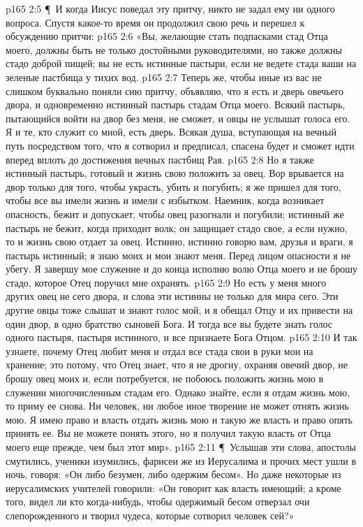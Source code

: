 \vs p165 2:5 \P\ И когда Иисус поведал эту притчу, никто не задал ему ни одного вопроса. Спустя какое\hyp{}то время он продолжил свою речь и перешел к обсуждению притчи:
\vs p165 2:6 «Вы, желающие стать подпасками стад Отца моего, должны быть не только достойными руководителями, но также должны  стадо доброй пищей; вы не есть истинные пастыри, если не ведете стада ваши на зеленые пастбища у тихих вод.
\vs p165 2:7 Теперь же, чтобы иные из вас не слишком буквально поняли сию притчу, объявляю, что я есть и дверь овечьего двора, и одновременно истинный пастырь стадам Отца моего. Всякий пастырь, пытающийся войти на двор без меня, не сможет, и овцы не услышат голоса его. Я и те, кто служит со мной, есть дверь. Всякая душа, вступающая на вечный путь посредством того, что я сотворил и предписал, спасена будет и сможет идти вперед вплоть до достижения вечных пастбищ Рая.
\vs p165 2:8 Но я также истинный пастырь, готовый и жизнь свою положить за овец. Вор врывается на двор только для того, чтобы украсть, убить и погубить; я же пришел для того, чтобы все вы имели жизнь и имели с избытком. Наемник, когда возникает опасность, бежит и допускает, чтобы овец разогнали и погубили; истинный же пастырь не бежит, когда приходит волк; он защищает стадо свое, а если нужно, то и жизнь свою отдает за овец. Истинно, истинно говорю вам, друзья и враги, я пастырь истинный; я знаю моих и мои знают меня. Перед лицом опасности я не убегу. Я завершу мое служение и до конца исполню волю Отца моего и не брошу стадо, которое Отец поручил мне охранять.
\vs p165 2:9 Но есть у меня много других овец не сего двора, и слова эти истинны не только для мира сего. Эти другие овцы тоже слышат и знают голос мой, и я обещал Отцу и их привести на один двор, в одно братство сыновей Бога. И тогда все вы будете знать голос одного пастыря, пастыря истинного, и все признаете Бога Отцом.
\vs p165 2:10 И так узнаете, почему Отец любит меня и отдал все стада свои в руки мои на хранение; это потому, что Отец знает, что я не дрогну, охраняя овечий двор, не брошу овец моих и, если потребуется, не побоюсь положить жизнь мою в служении многочисленным стадам его. Однако знайте, если я отдам жизнь мою, то приму ее снова. Ни человек, ни любое иное творение не может отнять жизнь мою. Я имею право и власть отдать жизнь мою и такую же власть и право опять принять ее. Вы не можете понять этого, но я получил такую власть от Отца моего еще прежде, чем был этот мир».
\vs p165 2:11 \P\ Услышав эти слова, апостолы смутились, ученики изумились, фарисеи же из Иерусалима и прочих мест ушли в ночь, говоря: «Он либо безумен, либо одержим бесом». Но даже некоторые из иерусалимских учителей говорили: «Он говорит как власть имеющий; а кроме того, видел ли кто когда\hyp{}нибудь, чтобы одержимый бесом отверзал очи слепорожденного и творил чудеса, которые сотворил человек сей?»
